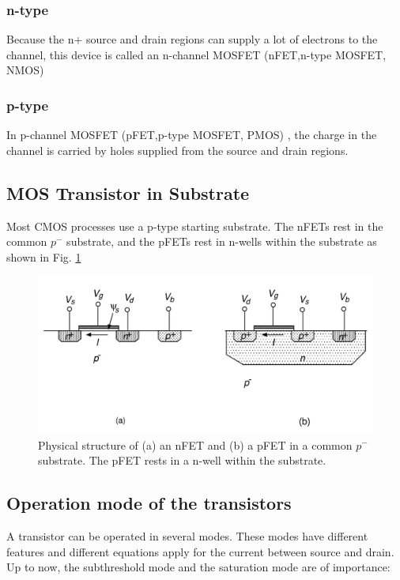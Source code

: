 \documentclass[main]{subfiles}
\begin{document}
\subsubsection{n-type}
    Because the n+ source and drain regions can supply a lot of electrons to the channel, this device is called an n-channel MOSFET (nFET,n-type MOSFET, NMOS) \cite{book:VLSI}
\subsubsection{p-type}
   In p-channel MOSFET (pFET,p-type MOSFET, PMOS) , the charge in the channel is carried by holes supplied from the source and drain regions.
    
\bigskip\subsection{MOS Transistor in Substrate}
Most CMOS processes use a p-type starting substrate.  The nFETs rest in the common $p^-$ substrate, and the pFETs rest in
n-wells within the substrate as shown in Fig. \ref{fig:MOSFET_Physical_Structure}

\begin{figure}[htbp]
  \centering
  \includegraphics[scale=0.8]{figs/MOSFET_Physical_structure.jpg}
  \caption{Physical structure of (a) an nFET and (b) a pFET in a common $p^-$ substrate. The pFET rests in a n-well within the substrate. \cite{book:VLSI}}
  \label{fig:MOSFET_Physical_Structure}
\end{figure}

\subsection{Operation mode of the transistors}

A transistor can be operated in several modes. These modes have different features and different equations apply for the current between source and drain. Up to now, the subthreshold mode and the saturation mode are of importance:
\end{document}
